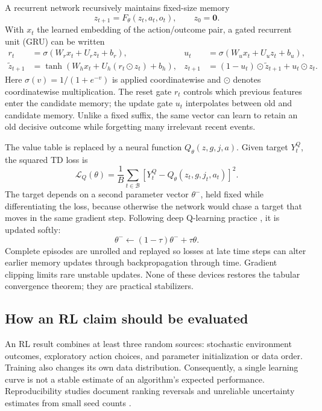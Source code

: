 \documentclass[11pt]{article}
\begin{document}
A recurrent network recursively maintains fixed-size memory
\begin{equation}
 z_{t+1}=F_\theta(z_t,a_t,o_t),\qquad z_0=\bm0.
 \label{eq:memory}
\end{equation}
With $x_t$ the learned embedding of the action/outcome pair, a gated recurrent
unit (GRU) \cite{cho2014} can be written
\begin{align}
 r_t&=\sigma(W_rx_t+U_rz_t+b_r),&
 u_t&=\sigma(W_ux_t+U_uz_t+b_u),\\
 \widetilde z_{t+1}&=\tanh(W_hx_t+U_h(r_t\odot z_t)+b_h),&
 z_{t+1}&=(1-u_t)\odot\widetilde z_{t+1}+u_t\odot z_t.
 \label{eq:gru}
\end{align}
Here $\sigma(v)=1/(1+e^{-v})$ is applied coordinatewise and $\odot$ denotes
coordinatewise multiplication. The reset gate $r_t$ controls which previous
features enter the candidate memory; the update gate $u_t$ interpolates between
old and candidate memory. Unlike a fixed suffix, the same vector can learn to
retain an old decisive outcome while forgetting many irrelevant recent events.

The value table is replaced by a neural function $Q_\theta(z,g,j,a)$. Given
target $Y_t^Q$, the squared TD loss is
\begin{equation}
 \mathcal L_Q(\theta)=\frac1B\sum_{t\in\mathcal B}
 [Y_t^Q-Q_\theta(z_t,g,j_t,a_t)]^2.
 \label{eq:q-loss}
\end{equation}
The target depends on a second parameter vector $\theta^-$, held fixed while
differentiating the loss, because otherwise the network would chase a target
that moves in the same gradient step. Following deep Q-learning practice
\cite{mnih2015}, it is updated softly:
\begin{equation}
 \theta^-\leftarrow(1-\tau)\theta^-+\tau\theta.
 \label{eq:target}
\end{equation}
Complete episodes are unrolled and replayed so losses at late time steps can
alter earlier memory updates through backpropagation through time. Gradient
clipping limits rare unstable updates. None of these devices restores the
tabular convergence theorem; they are practical stabilizers.

\subsection{How an RL claim should be evaluated}

An RL result combines at least three random sources: stochastic environment
outcomes, exploratory action choices, and parameter initialization or data
order. Training also changes its own data distribution. Consequently, a single
learning curve is not a stable estimate of an algorithm's expected
performance. Reproducibility studies document ranking reversals and unreliable
uncertainty estimates from small seed counts \cite{henderson2018,agarwal2021}.
\end{document}
